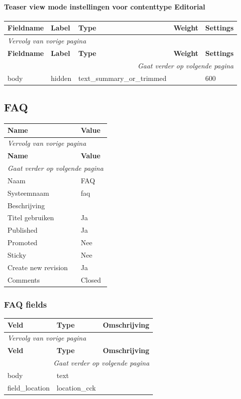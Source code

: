 \paragraph{Teaser view mode instellingen voor contenttype Editorial }

  \begin{longtable}{| p{3.00cm}|p{3.00cm}|p{3.00cm}|p{3.00cm}|p{3.00cm}|}
  \hline
  \rowcolor{tableheader}
  \textbf{Fieldname} & \textbf{Label} & \textbf{Type} & \textbf{Weight} & \textbf{Settings}  \tabularnewline
  \hline
\endfirsthead
\multicolumn{5}{l}{\textit{Vervolg van vorige pagina}} \\
\hline
\rowcolor{tableheader}
  \textbf{Fieldname} & \textbf{Label} & \textbf{Type} & \textbf{Weight} & \textbf{Settings}  \tabularnewline
  \hline
\hline
\endhead
\multicolumn{5}{r}{\textit{Gaat verder op volgende pagina}} \\
\endfoot
\hline
\endlastfoot
  body & hidden & text\_summary\_or\_trimmed &   & 600  \tabularnewline
  \hline
  \end{longtable}

\subsection{FAQ}
\label{sec:content-faq}
  \begin{longtable}{| p{7.50cm}|p{7.50cm}|}
  \hline
  \rowcolor{tableheader}
  \textbf{Name} & \textbf{Value}  \tabularnewline
  \hline
\endfirsthead
\multicolumn{2}{l}{\textit{Vervolg van vorige pagina}} \\
\hline
\rowcolor{tableheader}
  \textbf{Name} & \textbf{Value}  \tabularnewline
  \hline
\hline
\endhead
\multicolumn{2}{r}{\textit{Gaat verder op volgende pagina}} \\
\endfoot
\hline
\endlastfoot
  Naam & FAQ  \tabularnewline
  \hline
  Systeemnaam & faq  \tabularnewline
  \hline
  Beschrijving &   \tabularnewline
  \hline
  Titel gebruiken & Ja  \tabularnewline
  \hline
  Published & Ja  \tabularnewline
  \hline
  Promoted & Nee  \tabularnewline
  \hline
  Sticky & Nee  \tabularnewline
  \hline
  Create new revision & Ja  \tabularnewline
  \hline
  Comments & Closed  \tabularnewline
  \hline
  \end{longtable}

\subsubsection{FAQ fields}
  \begin{longtable}{| p{5.00cm}|p{5.00cm}|p{5.00cm}|}
  \hline
  \rowcolor{tableheader}
  \textbf{Veld} & \textbf{Type} & \textbf{Omschrijving}  \tabularnewline
  \hline
\endfirsthead
\multicolumn{3}{l}{\textit{Vervolg van vorige pagina}} \\
\hline
\rowcolor{tableheader}
  \textbf{Veld} & \textbf{Type} & \textbf{Omschrijving}  \tabularnewline
  \hline
\hline
\endhead
\multicolumn{3}{r}{\textit{Gaat verder op volgende pagina}} \\
\endfoot
\hline
\endlastfoot
  body & text &   \tabularnewline
  \hline
  field\_location & location\_cck &   \tabularnewline
  \hline
  \end{longtable}

